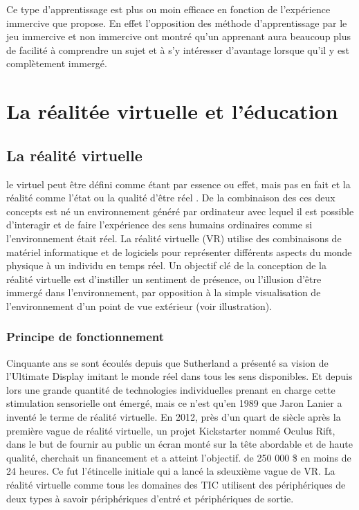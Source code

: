 Ce type d'apprentissage est plus ou moin efficace en fonction de l'expérience immercive que propose. En effet l'opposition des méthode d'apprentissage par le jeu immercive et non 
immercive ont montré qu'un apprenant aura beaucoup plus de facilité à comprendre un sujet et à s'y intéresser d'avantage lorsque qu'il y est complètement immergé\cite{de2017motivational,Shackelford2019RelationshipsBC,Abdelaziz2020TheIO}.

\section{La réalitée virtuelle et l'éducation}
\subsection{La réalité virtuelle}

le virtuel peut être défini comme \og étant par essence ou effet, mais pas en fait \fg\cite{Jerald2015WhatIV} et la réalité comme \og l'état ou la qualité d'être réel \fg\cite{Jerald2015WhatIV}. 
De la combinaison des ces deux concepts est né un environnement généré par ordinateur avec lequel il est possible d'interagir et de faire l'expérience des sens humains ordinaires comme si l'environnement était réel\cite{Rheingold1991VirtualR}. 
La réalité virtuelle (VR) utilise des combinaisons de matériel informatique et de logiciels pour représenter différents aspects du monde physique à un individu en temps réel. 
Un objectif clé de la conception de la réalité virtuelle est d'instiller un sentiment de présence, ou l'illusion d'être immergé dans l'environnement, par opposition à la simple visualisation de l'environnement d'un point de vue extérieur (voir illustration).

\subsubsection{Principe de fonctionnement}

Cinquante ans se sont écoulés depuis que Sutherland a présenté sa vision de l'Ultimate Display\cite{sutherland1965ultimate} imitant le monde réel dans tous les sens disponibles.
Et depuis lors une grande quantité de technologies individuelles prenant en charge cette stimulation sensorielle ont émergé, mais ce n'est qu'en 1989 que Jaron Lanier a inventé le terme de réalité virtuelle\cite{Rheingold1991VirtualR}.
En 2012, près d'un quart de siècle après la première vague de réalité virtuelle, un projet Kickstarter nommé Oculus Rift, dans le but de fournir au public un écran monté sur la tête abordable et de haute qualité, cherchait un financement et a atteint l'objectif. de 250 000 \$ en moins de 24 heures. Ce fut l'étincelle initiale qui a lancé la sdeuxième vague de VR\cite{anthes2016state}.
La réalité virtuelle comme tous les domaines des TIC utilisent des périphériques de deux types à savoir périphériques d'entré et périphériques de sortie.

